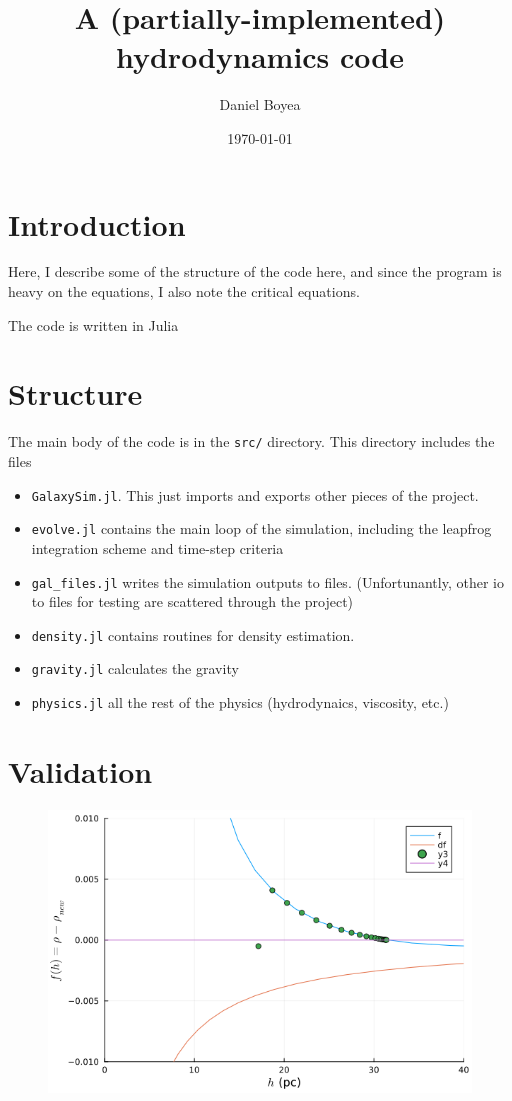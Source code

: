 \documentclass[12pt]{article}
\title{A (partially-implemented) hydrodynamics code}
\date{\today}
\author{Daniel Boyea}
\begin{document}
\maketitle

\section{Introduction}
Here, I describe some of the structure of the code here, and since the program is heavy on the equations, I also note the critical equations. 

The code is written in Julia

\section{Structure}
The main body of the code is in the \texttt{src/} directory. This directory includes the files
\begin{itemize}
    \item \texttt{GalaxySim.jl}. This just imports and exports other pieces of the project.
    \item \texttt{evolve.jl} contains the main loop of the simulation, including the leapfrog integration scheme and time-step criteria
    \item \verb|gal_files.jl| writes the simulation outputs to files. (Unfortunantly, other io to files for testing are scattered through the project)
    \item \texttt{density.jl} contains routines for density estimation.
    \item \texttt{gravity.jl} calculates the gravity
    \item \texttt{physics.jl} all the rest of the physics (hydrodynaics, viscosity, etc.)
\end{itemize}

\section{Validation}
\begin{figure}
    \includegraphics[width=\textwidth]{density.png}
\end{figure}
\end{document}
